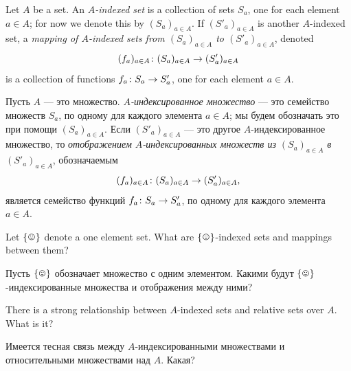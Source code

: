 \documentclass[CT4S-EN-RU]{subfiles}
\begin{document}
\begin{definitionENG}\label{def:indexed sets}
Let $A$ be a set. An {\em $A$-indexed set} is a collection of sets $S_a$, one for each element $a\in A$; for now we denote this by $(S_a)_{a\in A}$. If $(S'_a)_{a\in A}$ is another $A$-indexed set, a {\em mapping of $A$-indexed sets from $(S_a)_{a\in A}$ to $(S'_a)_{a\in A}$}, denoted $$(f_a)_{a\in A}\colon(S_a)_{a\in A}\rightarrow (S'_a)_{a\in A}$$ is a collection of functions $f_a\colon S_a\rightarrow S'_a$, one for each element $a\in A$.
\end{definitionENG}

\begin{definitionRUS}\label{def:indexed sets}
Пусть $A$ — это множество. {\em $A$-индексированное множество} — это семейство множеств $S_a$, по одному для каждого элемента $a\in A$; мы будем обозначать это при помощи $(S_a)_{a\in A}$. Если $(S'_a)_{a\in A}$ — это другое $A$-индексированное множество, то {\em отображением $A$-индексированных множеств из $(S_a)_{a\in A}$ в $(S'_a)_{a\in A}$}, обозначаемым $$(f_a)_{a\in A}\colon(S_a)_{a\in A}\rightarrow (S'_a)_{a\in A},$$ является семейство функций $f_a\colon S_a\rightarrow S'_a$, по одному для каждого элемента $a\in A$.
\end{definitionRUS}

\begin{exerciseENG}
Let $\singleton$ denote a one element set. What are $\singleton$-indexed sets and mappings between them?
\end{exerciseENG}

\begin{exerciseRUS}
Пусть $\singleton$ обозначает множество с одним элементом. Какими будут $\singleton$-индексированные множества и отображения между ними?
\end{exerciseRUS}

\begin{exerciseENG}
There is a strong relationship between $A$-indexed sets and relative sets over $A$. What is it?
\end{exerciseENG}

\begin{exerciseRUS}
Имеется тесная связь между $A$-индексированными множествами и относительными множествами над $A$. Какая?
\end{exerciseRUS}
\end{document}
